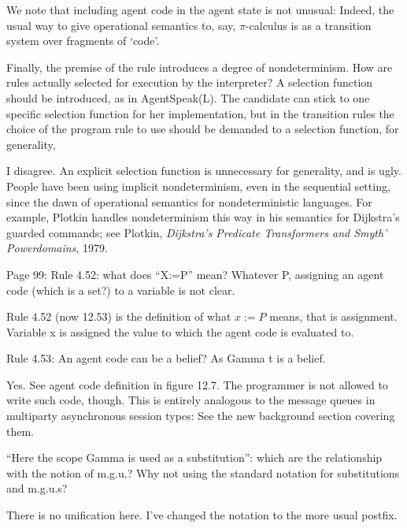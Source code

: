 \documentclass{article}
\newenvironment{them}{\noindent\begingroup\color{blue}}{\endgroup\par}
\begin{document}
We note that including agent code in the agent state is not unusual:
  Indeed, the usual way to give operational semantics to, say,
    $\pi$-calculus is as a transition system over fragments of `code'.

\begin{them}

Finally, the premise of the rule introduces a degree of nondeterminism. How are
rules actually selected for execution by the interpreter? A selection function
should be introduced, as in AgentSpeak(L). The candidate can stick to one
specific selection function for her implementation, but in the transition rules
the choice of the program rule to use should be demanded to a selection
function, for generality,

\end{them}
I disagree.
An explicit selection function is unnecessary for generality, and is ugly.
People have been using implicit nondeterminism,
  even in the sequential setting,
  since the dawn of operational semantics for nondeterministic languages.
For example,
  Plotkin handles nondeterminism this way in his semantics for
  Dijkstra's guarded commands;
see Plotkin, {\it Dijkstra's Predicate Transformers and Smyth' Powerdomains},
  1979.


\begin{them}

Page 99:
Rule 4.52: what does “X:=P” mean? Whatever P, assigning an agent code (which is
a set?) to a variable is not clear.

\end{them}
Rule 4.52 (now 12.53) is the definition of what $x:=P$ means, that is
assignment. Variable x is assigned the value to which the agent code is
evaluated to.

\begin{them}

Rule 4.53:
An agent code can be a belief? As Gamma t is a belief.
\end{them}
Yes. See agent code definition in figure 12.7.
The programmer is not allowed to write such code, though.
This is entirely analogous to the message queues in
  multiparty asynchronous session types:
  See the new background section covering them.

\begin{them}

“Here the scope Gamma is used as a substitution”: which are the relationship
with the notion of m.g.u.? Why not using the standard notation for
substitutions and m.g.u.s?

\end{them}
There is no unification here. I've changed the notation to the more usual
postfix.
\end{document}
